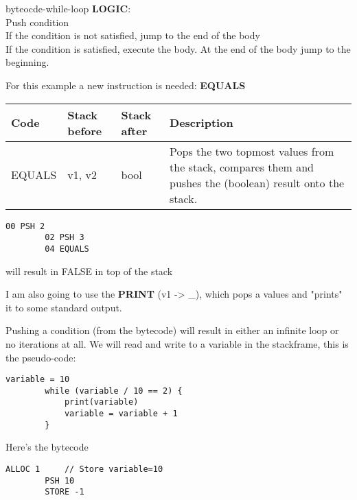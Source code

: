 \documentclass[preview]{standalone}
\begin{document}
\begin{snippet}{byteocde-while-loop}
    \textbf{LOGIC}:
    \\
    Push condition
    \\
    If the condition is not satisfied, jump to the end of the body
    \\
    If the condition is satisfied, execute the body. At the end of the body jump to the beginning.
    
    For this example a new instruction is needed: \textbf{EQUALS}
    
    \bgroup{}
    \def\arraystretch{1.25}
    \begin{center}
        \begin{tabular}{ |l|l|l|p{7cm}| }
            \hline
            \textbf{Code} & \textbf{Stack before} & \textbf{Stack after} & \textbf{Description} \\
            \hline
            EQUALS & v1, v2 & bool & Pops the two topmost values from the stack, compares them and pushes the (boolean) result onto the stack.        \\
            \hline
        \end{tabular}
    \end{center}
    \egroup{}
    
    \begin{lstlisting}[style=generic]
        00 PSH 2
        02 PSH 3
        04 EQUALS
    \end{lstlisting}
    
    will result in FALSE in top of the stack
    
    I am also going to use the \textbf{PRINT} (v1 -> \_), which pops a values and "prints" it to some standard output.
    
    Pushing a condition (from the bytecode) will result in either an infinite loop or no iterations at all.
    We will read and write to a variable in the stackframe, this is the pseudo-code:
    
    \begin{lstlisting}[style=generic]
        variable = 10
        while (variable / 10 == 2) {
            print(variable)
            variable = variable + 1
        }
    \end{lstlisting}
    
    Here's the bytecode
    
    \begin{lstlisting}[style=generic]
        ALLOC 1     // Store variable=10
        PSH 10
        STORE -1
        

\end{lstlisting}
\end{snippet}
\end{document}

